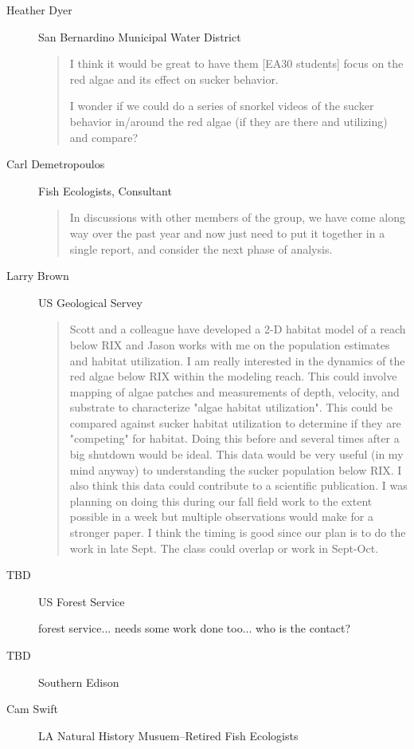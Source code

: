\documentclass{tufte-handout}\usepackage[]{graphicx}\usepackage[]{color}
\begin{document}
\begin{description}
\item[Heather Dyer] San Bernardino Municipal Water District

\begin{quote}
I think it would be great to have them [EA30 students] focus on the red algae and its effect on sucker behavior.  

I wonder if we could do a series of snorkel videos of the sucker behavior in/around the red algae (if they are there and utilizing) and compare?

\end{quote}

\item[Carl Demetropoulos] Fish Ecologists, Consultant

\begin{quote}
In discussions with other members of the group, we have come along way over the past year and now just need to put it together in a single report, and consider the next phase of analysis.  
\end{quote}

\item[Larry Brown] US Geological Servey

\begin{quote}
Scott and a colleague have developed a 2-D habitat model of a reach below RIX and Jason works with me on the population estimates and habitat utilization. I am really interested in the dynamics of the red algae below RIX within the modeling reach. This could involve mapping of algae patches and measurements of depth, velocity, and substrate to characterize "algae habitat utilization". This could be compared against sucker habitat utilization to determine if they are "competing" for habitat. Doing this before and several times after a big shutdown would be ideal. This data would be very useful (in my mind anyway) to understanding the sucker population below RIX. I also think this data could contribute to a scientific publication. I was planning on doing this during our fall field work to the extent possible in a week but multiple observations would make for a stronger paper. I think the timing is good since our plan is to do the work in late Sept. The class could overlap or work in Sept-Oct.
\end{quote}

\item[TBD] US Forest Service

forest service... needs some work done too... who is the contact?

\item[TBD] Southern Edison

\item[Cam Swift] LA Natural History Musuem--Retired Fish Ecologists


\end{description}
\end{document}
